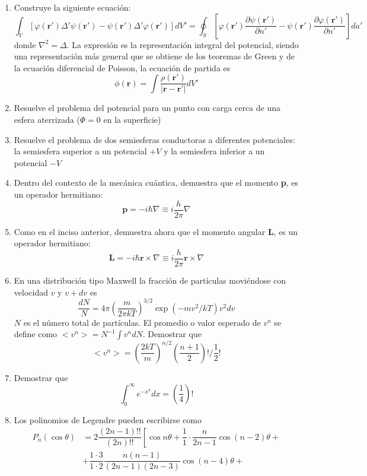 \begin{enumerate}
\item Construye la siguiente ecuación:
\[  \int_{V} \left[ \varphi(\mathbf{r}') \Delta' \psi (\mathbf{r}') - \psi (\mathbf{r}') \Delta' \varphi (\mathbf{r}') \right] dV' = \oint_{S} \left[ \varphi(\mathbf{r}') \dfrac{\partial \psi (\mathbf{r}')}{\partial n'} - \psi (\mathbf{r}') \dfrac{\partial \varphi (\mathbf{r}')}{\partial n'} \right] da' \]
donde $\nabla^{2} =  \Delta$. La expresión es la representación integral del potencial, siendo una representación más general que se obtiene de los teoremas de Green y de la ecuación diferencial de Poisson, la ecuación de partida es
\[ \phi (\mathbf{r}) =  \int	\dfrac{\rho(\mathbf{r}')}{\vert \mathbf{r} - \mathbf{r}' \vert} dV' \]
\item Resuelve el problema del potencial para un punto con carga cerca de una esfera aterrizada ($\Phi = 0$ en la superficie)
\item Resuelve el problema de dos semiesferas conductoras a diferentes potenciales: la semiesfera superior a un potencial $+V$ y la semiesfera inferior a un potencial $-V$
\item Dentro del contexto de la mecánica cuántica, demuestra que el momento \textbf{p}, es un operador hermitiano:
\[ \mathbf{p} =  - i \hbar \nabla \equiv i \dfrac{h}{2 \pi} \nabla \]
\item Como en el inciso anterior, demuestra ahora que el momento angular \textbf{L}, es un operador hermitiano:
\[ \mathbf{L} = - i \hbar \mathbf{r} \times \nabla \equiv i \dfrac{h}{2 \pi} \mathbf{r} \times \nabla \]
\item En una distribución tipo Maxwell la fracción de partículas moviéndose con velocidad $v$ y $v+dv$ es
\[ \dfrac{dN}{N} = 4 \pi \left( \dfrac{m}{2 \pi k T} \right)^{3/2} \exp(-mv^{2}/ k T) v^{2} dv \]
$N$ es el número total de partículas. El promedio o valor esperado de $v^{n}$ se define como $<v^{n}> = N^{-1} \int v^{n} dN$. Demostrar que
\[ < v^{n} > = \left( \dfrac{2 k T}{m} \right)^{n/2} \left( \dfrac{n+1}{2} \right) ! \Bigg/ \dfrac{1}{2} ! \]
\item Demostrar que
\[ \int_{0}^{\infty} e^{-x^{4}} dx = \left( \dfrac{1}{4} \right) !\]
\item Los polinomios de Legendre pueden escribirse como
\[ \begin{split}
P_{n}(\cos \theta) &= 2 \dfrac{(2n-1)!!}{(2n)!!} \left[ \cos n\theta + \dfrac{1}{1} \cdot \dfrac{n}{2n-1} \cos(n-2) \theta + \right. \\
&+ \dfrac{1 \cdot 3}{1 \cdot 2} \dfrac{n(n-1)}{(2n-1)(2n-3)} \cos(n-4) \theta + \\

\end{split}\]
\end{enumerate}
